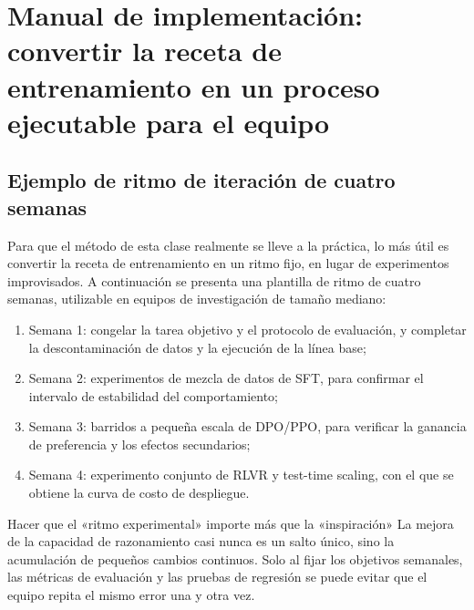 \documentclass[a4paper]{article}
\begin{document}
\section{Manual de implementación: convertir la receta de entrenamiento en un proceso ejecutable para el equipo}

\subsection{Ejemplo de ritmo de iteración de cuatro semanas}
Para que el método de esta clase realmente se lleve a la práctica, lo más útil es convertir la receta de entrenamiento en un ritmo fijo, en lugar de experimentos improvisados. A continuación se presenta una plantilla de ritmo de cuatro semanas, utilizable en equipos de investigación de tamaño mediano:
\begin{enumerate}
    \item Semana 1: congelar la tarea objetivo y el protocolo de evaluación, y completar la descontaminación de datos y la ejecución de la línea base;
    \item Semana 2: experimentos de mezcla de datos de SFT, para confirmar el intervalo de estabilidad del comportamiento;
    \item Semana 3: barridos a pequeña escala de DPO/PPO, para verificar la ganancia de preferencia y los efectos secundarios;
    \item Semana 4: experimento conjunto de RLVR y test-time scaling, con el que se obtiene la curva de costo de despliegue.
\end{enumerate}

\begin{importantbox}{Hacer que el «ritmo experimental» importe más que la «inspiración»}
La mejora de la capacidad de razonamiento casi nunca es un salto único, sino la acumulación de pequeños cambios continuos. Solo al fijar los objetivos semanales, las métricas de evaluación y las pruebas de regresión se puede evitar que el equipo repita el mismo error una y otra vez.
\end{importantbox}
\end{document}
